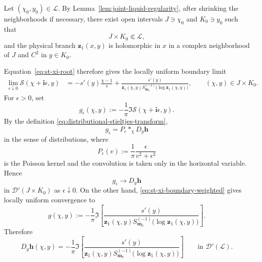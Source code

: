 \documentclass[11pt]{amsart}
\theoremstyle{plain}
\numberwithin{equation}{section}
\numberwithin{theorem}{section}
\numberwithin{figure}{section}
\begin{document}
Let $(\chi_0,y_0)\in\mathcal L$. By
Lemma~\ref{lem:joint-liquid-regularity}, after shrinking the
neighborhoods if necessary, there exist open intervals
$J\ni\chi_0$ and $K_0\ni y_0$ such that
\[
    J\times K_0\Subset\mathcal L,
\]
and the physical branch $\mathbf z_1(x,y)$ is holomorphic in $x$ in
a complex neighborhood of $J$ and $C^2$ in $y\in K_0$.

Equation~\eqref{eq:st-xi-root} therefore gives the locally uniform
boundary limit
\begin{align}
\lim_{\epsilon\downarrow0}
\mathcal S(\chi+\mathbf i\epsilon,y)
&=
-s'(y)\frac{\chi-1}{s}
+
\frac{s'(y)}{
    \mathbf z_1(\chi,y)
    S_{\mathbf m_0}^{(-1)}
    \bigl(\log\mathbf z_1(\chi,y)\bigr)
},
\qquad (\chi,y)\in J\times K_0.
\label{eq:st-xi-boundary-weighted}
\end{align}
For $\epsilon>0$, set
\[
    g_\epsilon(\chi,y)
    :=
    -\frac{1}{\pi}
    \Im\mathcal S(\chi+\mathbf i\epsilon,y).
\]
By the definition \eqref{eq:distributional-stieltjes-transform},
\[
    g_\epsilon
    =
    P_\epsilon*_{\chi}D_y\mathbf h
\]
in the sense of distributions, where
\[
    P_\epsilon(v)
    :=
    \frac{1}{\pi}
    \frac{\epsilon}{v^2+\epsilon^2}
\]
is the Poisson kernel and the convolution is taken only in the
horizontal variable. Hence
\[
    g_\epsilon
    \longrightarrow
    D_y\mathbf h
\]
in $\mathcal D'(J\times K_0)$ as $\epsilon\downarrow0$. On the other
hand, \eqref{eq:st-xi-boundary-weighted} gives locally uniform
convergence to
\[
    g(\chi,y)
    :=
    -\frac{1}{\pi}
    \Im\left[
        \frac{s'(y)}{
            \mathbf z_1(\chi,y)
            S_{\mathbf m_0}^{(-1)}
            \bigl(\log\mathbf z_1(\chi,y)\bigr)
        }
    \right].
\]
Therefore
\begin{equation}
    D_y\mathbf h(\chi,y)
    =
    -\frac{1}{\pi}
    \Im\left[
        \frac{s'(y)}{
            \mathbf z_1(\chi,y)
            S_{\mathbf m_0}^{(-1)}
            \bigl(\log\mathbf z_1(\chi,y)\bigr)
        }
    \right]
    \qquad\text{in }\mathcal D'(\mathcal L).
    \label{eq:weak-vertical-density}
\end{equation}
\end{document}
